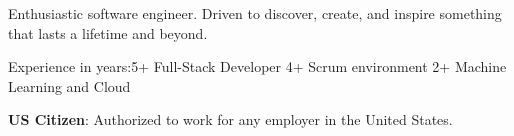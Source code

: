 \begin{cventries}
  \cventry
    {}
    {}
    {}
    {}
    {
      \vspace{-7mm}\begin{cvitems}
\item {Enthusiastic software engineer. Driven to discover, create, and inspire something that lasts a lifetime and beyond.}\vspace{1mm}  
\item {Experience in years:\hspace*{2.5mm}5+ Full-Stack Developer \hspace*{3.5mm}  4+ Scrum environment \hspace*{3.5mm}  2+ Machine Learning and Cloud}\vspace{1mm}
\item { \textbf{US Citizen}: Authorized to work for any employer in the United States.}\vspace{1mm}
\end{cvitems}
    }
\end{cventries}
